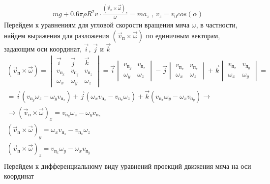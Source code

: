 \documentclass[a5paper, 10pt]{article}
\theoremstyle{definition}
\theoremstyle{plain}
\theoremstyle{remark}
\begin{document}
\begin{multline}
m g +0.6 \pi \rho  R^{2} v  \cdot  \frac{  \left( \vec{v}_{\text{п}} \times \vec{\omega} \right)_{z}}{  \omega} = m a_{z} \text{ , } v_{z} = v_0 cos \left( \alpha \right)
\end{multline}
Перейдем к уравнениям для угловой скорости вращения мяча $ \omega $, в частности, найдем выражения для разложения   $ \left( \vec{v}_{\text{п}} \times \vec{\omega} \right) $ по единичным векторам, задающим оси координат, $ \vec{i}$, $ \vec{j}$ и $ \vec{k}$
\begin{multline}
\left( \vec{v}_{\text{п}} \times \vec{\omega} \right) = 
\begin{vmatrix}
\vec{i} & \vec{j} & \vec{k} \\
v_{\text{п}_{x}} & v_{\text{п}_{y}} & v_{\text{п}_{z}} \\
\omega _{x} & \omega _{y} & \omega _{z}
\end{vmatrix}
= \vec{i} 
\begin{vmatrix}
 v_{\text{п}_{y}} & v_{\text{п}_{z}} \\
\omega _{y} & \omega _{z}
\end{vmatrix}
- \vec{j}
\begin{vmatrix}
 v_{\text{п}_{x}} & v_{\text{п}_{z}} \\
\omega _{x} & \omega _{z}
\end{vmatrix}
+ \vec{k}
\begin{vmatrix}
 v_{\text{п}_{x}} & v_{\text{п}_{y}} \\
\omega _{x} & \omega _{y}
\end{vmatrix}
=\\
= \vec{i}  \left( v_{\text{п}_{y}} \omega _{z} - \omega _{y} v_{\text{п}_{z}} \right) + \vec{j} \left( \omega _{x} v_{\text{п}_{z}} - v_{\text{п}_{x}} \omega _{z} \right) + \vec{k} \left(  v_{\text{п}_{x}} \omega _{y} - \omega _{x} v_{\text{п}_{y}} \right) \to \\
\to \left( \vec{v}_{\text{п}} \times \vec{\omega} \right)_{x} = v_{\text{п}_{y}} \omega _{z} - \omega _{y} v_{\text{п}_{z}}\\
 \left( \vec{v}_{\text{п}} \times \vec{\omega} \right)_{y} = \omega _{x} v_{\text{п}_{z}} - v_{\text{п}_{x}} \omega _{z}\\
 \left( \vec{v}_{\text{п}} \times \vec{\omega} \right)_{z} =  v_{\text{п}_{x}} \omega _{y} - \omega _{x} v_{\text{п}_{y}}\\
\end{multline}
Перейдем к дифференциальному виду уравнений проекций движения мяча на оси координат
\end{document}

